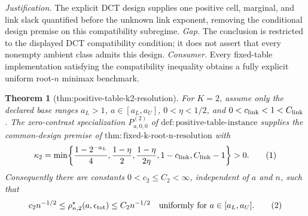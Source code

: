 \documentclass{article}
\newtheorem{theorem}{Theorem}
\begin{document}
\par\smallskip\noindent \textit{Justification.} The explicit DCT design supplies one positive cell, marginal, and link slack quantified before the unknown link exponent, removing the conditional design premise on this compatibility subregime. \textit{Gap.} The conclusion is restricted to the displayed DCT compatibility condition; it does not assert that every nonempty ambient class admits this design. \textit{Consumer.} Every fixed-table implementation satisfying the compatibility inequality obtains a fully explicit uniform root-\(n\) minimax benchmark.

\begin{theorem}[thm:positive-table-k2-resolution]\label{thm:positive-table-k2-resolution}
For \(K=2\), assume only the declared base ranges \(a_L>1\), \(a\in[a_L,a_U]\), \(0<\eta<1/2\), and \(0<c_{\rm link}<1<C_{\rm link}\). The zero-contrast specialization \(P^{(2)}_{a,0,0}\) of \(\mathrm{def:positive\mbox{-}table\mbox{-}instance}\) supplies the common-design premise of \(\mathrm{thm:fixed\mbox{-}k\mbox{-}root\mbox{-}n\mbox{-}resolution}\) with
\[
\kappa_2
=\min\!\left\{
\frac{1-2^{-a_L}}4,
\frac{1-\eta}{2},
\frac{1-\eta}{2\eta},
1-c_{\rm link},
C_{\rm link}-1
\right\}>0.
\tag{1}
\]
Consequently there are constants \(0<c_2\le C_2<\infty\), independent of \(a\) and \(n\), such that
\[
c_2n^{-1/2}
\le \rho^\star_{n,2}(a,\epsilon_{\rm tot})
\le C_2n^{-1/2}
\quad\text{uniformly for }a\in[a_L,a_U].
\tag{2}
\]
\end{theorem}
\end{document}
